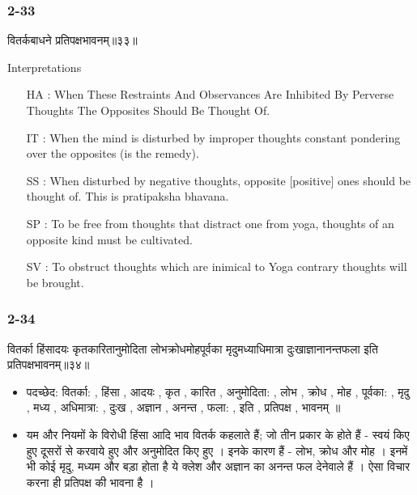 \begin{frame}[fragile]\frametitle{2-33}
\begin{sanskrit}
वितर्कबाधने प्रतिपक्षभावनम्॥३३॥
\end{sanskrit}

Interpretations
\begin{itemize}
\item [HA]: When These Restraints And Observances Are Inhibited By Perverse Thoughts The Opposites Should Be Thought Of.
\item [IT]: When the mind is disturbed by improper thoughts constant pondering over the opposites (is the remedy).
\item [SS]: When disturbed by negative thoughts, opposite [positive] ones should be thought of. This is pratipaksha bhavana.
\item [SP]: To be free from thoughts that distract one from yoga, thoughts of an opposite kind must be cultivated.
\item [SV]: To obstruct thoughts which are inimical to Yoga contrary thoughts will be brought. 
\end{itemize}
\end{frame}

\begin{frame}[fragile]\frametitle{2-34}
\begin{sanskrit}
वितर्का हिंसादयः कृतकारितानुमोदिता लोभक्रोधमोहपूर्वका मृदुमध्याधिमात्रा दुःखाज्ञानानन्तफला इति प्रतिपक्षभावनम्॥३४॥
\end{sanskrit}

	\begin{itemize}
	\item पदच्छेद: वितर्का: , हिंसा , आदयः , कृत , कारित , अनुमोदिता: , लोभ , क्रोध , मोह , पूर्वका: , मृदु , मध्य , अधिमात्रा: , दुःख , अज्ञान , अनन्त , फला: , इति , प्रतिपक्ष , भावनम् ॥
	\item यम और नियमों के विरोधी हिंसा आदि भाव वितर्क कहलाते हैं; जो तीन प्रकार के होते हैं - स्वयं किए हुए दूसरों से करवाये हुए और अनुमोदित किए हुए । इनके कारण हैं - लोभ, क्रोध और मोह । इनमें भी कोई मृदु, मध्यम और बड़ा होता है ये क्लेश और अज्ञान का अनन्त फल देनेवाले हैं । ऐसा विचार करना ही प्रतिपक्ष की भावना है ।
	\end{itemize}	
\end{frame}


